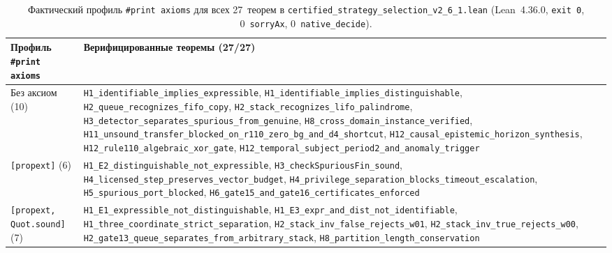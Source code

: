 \documentclass[11pt,a4paper]{article}
\theoremstyle{cleanthm}
\theoremstyle{cleandef}
\begin{document}
\begin{table}[!htbp]
\centering
\caption{Фактический профиль \texttt{\#print axioms} для всех 27~теорем в \texttt{certified\_strategy\_selection\_v2\_6\_1.lean} (Lean~4.36.0, \texttt{exit 0}, 0~\texttt{sorryAx}, 0~\texttt{native\_decide}).}
\label{tab:axioms_v26}
\footnotesize
\begin{tabularx}{\linewidth}{@{}l >{\raggedright\arraybackslash}X@{}}
\toprule
\textbf{Профиль \texttt{\#print axioms}} & \textbf{Верифицированные теоремы (27/27)} \\
\midrule
Без аксиом (10) & \texttt{H1\_identifiable\_\allowbreak implies\_\allowbreak expressible}, \texttt{H1\_identifiable\_\allowbreak implies\_\allowbreak distinguishable}, \texttt{H2\_queue\_\allowbreak recognizes\_\allowbreak fifo\_\allowbreak copy}, \texttt{H2\_stack\_\allowbreak recognizes\_\allowbreak lifo\_\allowbreak palindrome}, \texttt{H3\_detector\_\allowbreak separates\_\allowbreak spurious\_\allowbreak from\_\allowbreak genuine}, \texttt{H8\_cross\_\allowbreak domain\_\allowbreak instance\_\allowbreak verified}, \texttt{H11\_unsound\_\allowbreak transfer\_\allowbreak blocked\_\allowbreak on\_\allowbreak r110\_\allowbreak zero\_\allowbreak bg\_\allowbreak and\_\allowbreak d4\_\allowbreak shortcut}, \texttt{H12\_causal\_\allowbreak epistemic\_\allowbreak horizon\_\allowbreak synthesis}, \texttt{H12\_rule110\_\allowbreak algebraic\_\allowbreak xor\_\allowbreak gate}, \texttt{H12\_temporal\_\allowbreak subject\_\allowbreak period2\_\allowbreak and\_\allowbreak anomaly\_\allowbreak trigger} \\
\texttt{[propext]} (6) & \texttt{H1\_E2\_distinguishable\_\allowbreak not\_\allowbreak expressible}, \texttt{H3\_checkSpuriousFin\_sound}, \texttt{H4\_licensed\_\allowbreak step\_\allowbreak preserves\_\allowbreak vector\_\allowbreak budget}, \texttt{H4\_privilege\_\allowbreak separation\_\allowbreak blocks\_\allowbreak timeout\_\allowbreak escalation}, \texttt{H5\_spurious\_\allowbreak port\_\allowbreak blocked}, \texttt{H6\_gate15\_\allowbreak and\_\allowbreak gate16\_\allowbreak certificates\_\allowbreak enforced} \\
\texttt{[propext, Quot.sound]} (7) & \texttt{H1\_E1\_expressible\_\allowbreak not\_\allowbreak distinguishable}, \texttt{H1\_E3\_expr\_\allowbreak and\_\allowbreak dist\_\allowbreak not\_\allowbreak identifiable}, \texttt{H1\_three\_\allowbreak coordinate\_\allowbreak strict\_\allowbreak separation}, \texttt{H2\_stack\_\allowbreak inv\_\allowbreak false\_\allowbreak rejects\_\allowbreak w01}, \texttt{H2\_stack\_\allowbreak inv\_\allowbreak true\_\allowbreak rejects\_\allowbreak w00}, \texttt{H2\_gate13\_\allowbreak queue\_\allowbreak separates\_\allowbreak from\_\allowbreak arbitrary\_\allowbreak stack}, \texttt{H8\_partition\_\allowbreak length\_\allowbreak conservation} \\

\end{tabularx}
\end{table}
\end{document}
